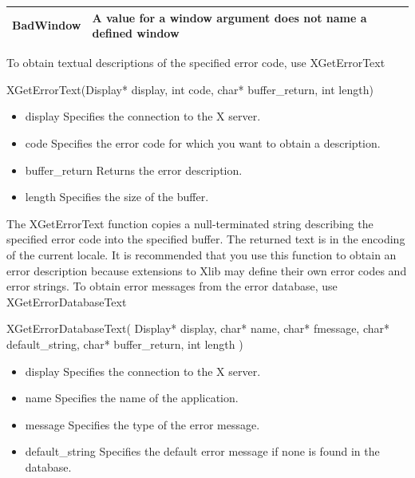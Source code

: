 \documentclass{report}
\begin{document}
\begin{itemize}
\begin{center}
\begin{tabularx}{\textwidth}{@{}lXl@{}}
                    BadWindow& A value for a window argument does not name a defined window \\
                    \bottomrule
                \end{tabularx}
            \end{center}
            To obtain textual descriptions of the specified error code, use XGetErrorText
            \bigbreak \noindent 
            \begin{cppcode}
                XGetErrorText(Display* display, int code, char* buffer_return, int length)
            \end{cppcode}
            \begin{itemize}
                \item display Specifies the connection to the X server.
                \item code Specifies the error code for which you want to obtain a description.
                \item buffer\_return Returns the error description.
                \item length Specifies the size of the buffer.
            \end{itemize}
            The XGetErrorText function copies a null-terminated string describing the specified error code into the specified buffer. The returned text is in the encoding of the current locale. It is recommended that you use this function to obtain an error description because extensions to Xlib may define their own error codes and error strings.
            \bigbreak \noindent 
            To obtain error messages from the error database, use XGetErrorDatabaseText
            \bigbreak \noindent 
            \begin{cppcode}
                XGetErrorDatabaseText(
                    Display* display,
                    char* name,
                    char* fmessage,
                    char* default_string,
                    char* buffer_return,
                    int length
                )
            \end{cppcode}
            \begin{itemize}
                \item display Specifies the connection to the X server.
                \item name Specifies the name of the application.
                \item message Specifies the type of the error message.
                \item default\_string Specifies the default error message if none is found in the database.

\end{itemize}
\end{itemize}
\end{document}
